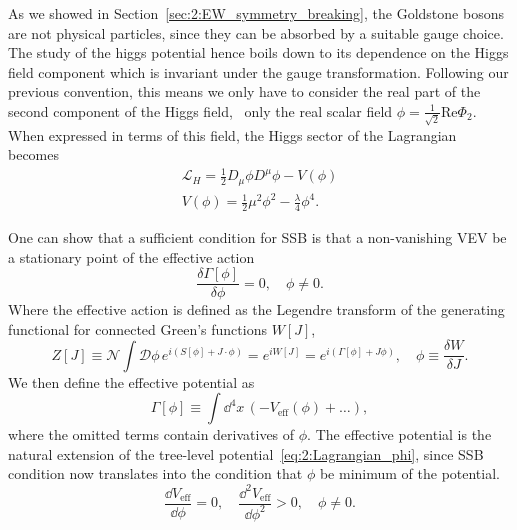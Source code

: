 As we showed in Section~\ref{sec:2:EW_symmetry_breaking}, the Goldstone bosons are not physical particles, since they can be absorbed by a suitable gauge choice. The study of the higgs potential hence boils down to its dependence on the Higgs field component which is invariant under the gauge transformation. Following our previous convention, this means we only have to consider the real part of the second component of the Higgs field, \ie\ only the real scalar field $\phi = \frac{1}{\sqrt{2}} \text{Re} \Phi_2$. When expressed in terms of this field, the Higgs sector of the Lagrangian becomes
\begin{equation}
\begin{gathered}
\mathcal{L}_H = \frac{1}{2} D_\mu \phi D^\mu \phi - V(\phi) \\
V(\phi) =  \frac{1}{2} \mu^2 \phi^2 - \frac{\lambda}{4} \phi^4.
\end{gathered}
\label{eq:2:Lagrangian_phi}
\end{equation}

One can show that a sufficient condition for \acs{SSB} is that a non-vanishing \acs{VEV} be a stationary point of the effective action
\begin{equation}
\frac{\delta \Gamma [\phi]}{\delta \phi} = 0, \quad \phi \neq 0.
\label{eq:2:SSB_condition}
\end{equation}
Where the effective action is defined as the Legendre transform of the generating functional for connected Green's functions $W[J]$, \ie
\begin{equation}
Z[J] \equiv \mathcal{N} \int \mathcal{D} \phi \, e^{i (S[\phi] + J \cdot \phi)} = e^{i W[J]} = e^{i (\Gamma[\phi] + J \phi)}, \quad \phi \equiv \frac{\delta W}{\delta J}.
\end{equation}
We then define the effective potential as
\begin{equation}
\Gamma [\phi] \equiv \int \dd^4 x\, \left(-V_{\text{eff}}(\phi) + \ldots \right),
\label{eq:2:Veff}
\end{equation}
where the omitted terms contain derivatives of $\phi$. The effective potential is the natural extension of the tree-level potential~\eqref{eq:2:Lagrangian_phi}, since \acs{SSB} condition now translates into the condition that $\phi$ be minimum of the potential.
\begin{equation}
\frac{\dd V_\text{eff}}{\dd \phi} = 0, \quad \frac{\dd^2 V_\text{eff}}{\dd \phi^2} > 0, \quad \phi \neq 0.
\end{equation}

